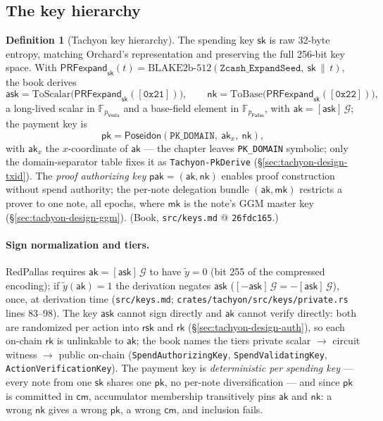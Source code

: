\documentclass[11pt,a4paper]{article}
\theoremstyle{definition}
\newtheorem{definition}[theorem]{Definition}
\newcommand{\F}{\mathbb{F}}
\newcommand{\cmsym}{\mathsf{cm}}
\newcommand{\rk}{\mathsf{rk}}
\newcommand{\Pallas}{\ensuremath{\mathsf{Pallas}}}
\newcommand{\Vesta}{\ensuremath{\mathsf{Vesta}}}
\newcommand{\ask}{\ensuremath{\mathsf{ask}}}
\newcommand{\aksym}{\ensuremath{\mathsf{ak}}}
\newcommand{\nksym}{\ensuremath{\mathsf{nk}}}
\newcommand{\rsk}{\ensuremath{\mathsf{rsk}}}
\begin{document}
\subsection{The key hierarchy}\label{sec:tachyon-design-keys}

\begin{definition}[Tachyon key hierarchy]\label{def:tachyon-design-keys}
The spending key $\mathsf{sk}$ is raw 32-byte entropy, matching Orchard's
representation and preserving the full 256-bit key space. With
$\mathsf{PRFexpand}_{\mathsf{sk}}(t) =
\text{BLAKE2b-512}(\texttt{Zcash\_ExpandSeed},\ \mathsf{sk} \,\|\, t)$,
the book derives
\[
\ask = \mathrm{ToScalar}\bigl(\mathsf{PRFexpand}_{\mathsf{sk}}
  ([\mathtt{0x21}])\bigr), \qquad
\nksym = \mathrm{ToBase}\bigl(\mathsf{PRFexpand}_{\mathsf{sk}}
  ([\mathtt{0x22}])\bigr),
\]
a long-lived scalar in $\F_{p_{\Vesta}}$ and a base-field element in
$\F_{p_{\Pallas}}$, with $\aksym = [\ask]\,\mathcal{G}$; the payment key is
\[
\mathsf{pk} = \mathsf{Poseidon}(\texttt{PK\_DOMAIN},\ \aksym_x,\ \nksym),
\]
with $\aksym_x$ the $x$-coordinate of $\aksym$ --- the chapter leaves
\texttt{PK\_DOMAIN} symbolic; only the domain-separator table fixes it as
\texttt{Tachyon-PkDerive} (\S\ref{sec:tachyon-design-txid}). The
\emph{proof authorizing key} $\mathsf{pak} = (\aksym, \nksym)$ enables
proof construction without spend authority; the per-note delegation bundle
$(\aksym, \mathsf{mk})$ restricts a prover to one note, all epochs, where
$\mathsf{mk}$ is the note's GGM master key
(\S\ref{sec:tachyon-design-ggm}). (Book, \texttt{src/keys.md} @
\texttt{26fdc165}.)
\end{definition}

\paragraph{Sign normalization and tiers.} RedPallas requires
$\aksym = [\ask]\,\mathcal{G}$ to have $\tilde{y} = 0$ (bit 255 of the
compressed encoding); if $\tilde{y}(\aksym) = 1$ the derivation negates
$\ask$ ($[-\ask]\,\mathcal{G} = -[\ask]\,\mathcal{G}$), once, at derivation
time (\texttt{src/keys.md}; \texttt{crates/tachyon/src/keys/private.rs}
lines 83--98). The key $\ask$ cannot sign directly and $\aksym$ cannot
verify directly: both are randomized per action into $\rsk$ and $\rk$
(\S\ref{sec:tachyon-design-auth}), so each on-chain $\rk$ is unlinkable to
$\aksym$; the book names the tiers private scalar $\to$ circuit witness
$\to$ public on-chain (\texttt{SpendAuthorizingKey},
\texttt{SpendValidatingKey}, \texttt{ActionVerificationKey}). The payment
key is \emph{deterministic per spending key} --- every note from one
$\mathsf{sk}$ shares one $\mathsf{pk}$, no per-note diversification --- and
since $\mathsf{pk}$ is committed in $\cmsym$, accumulator membership
transitively pins $\aksym$ and $\nksym$: a wrong $\nksym$ gives a wrong
$\mathsf{pk}$, a wrong $\cmsym$, and inclusion fails.
\end{document}
